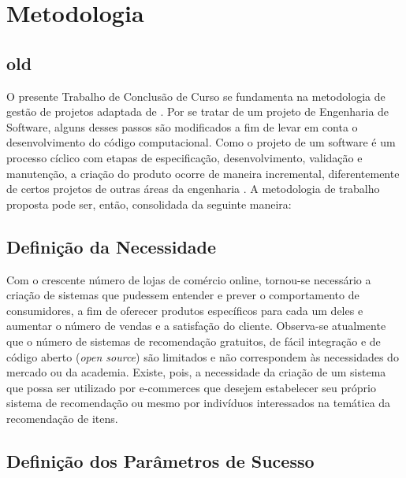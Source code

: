 \chapter[Metodologia]{Metodologia}
\label{chap:metodologia}


\section{old} %
\label{sec:old}

O presente Trabalho de Conclusão de Curso se fundamenta na metodologia de gestão de projetos adaptada de \cite{pmbok}. Por se tratar de um projeto de Engenharia de Software, alguns desses passos são modificados a fim de levar em conta o desenvolvimento do código computacional. Como o projeto de um software é um processo cíclico com etapas de especificação, desenvolvimento, validação e manutenção, a criação do produto ocorre de maneira incremental, diferentemente de certos projetos de outras áreas da engenharia \cite{iterative-development}. A metodologia de trabalho proposta pode ser, então, consolidada da seguinte maneira: 

\section{Definição da Necessidade} %
\label{sec:defini_o_da_necessidade}


Com o crescente número de lojas de comércio online, tornou-se necessário a criação de sistemas que pudessem entender e prever o comportamento de consumidores, a fim de oferecer produtos específicos para cada um deles e aumentar o número de vendas e a satisfação do cliente. Observa-se atualmente que o número de sistemas de recomendação gratuitos, de fácil integração e de código aberto (\textit{open source}) são limitados e não correspondem às necessidades do mercado ou da academia. Existe, pois, a necessidade da criação de um sistema que possa ser utilizado por e-commerces que desejem estabelecer seu próprio sistema de recomendação ou mesmo por indivíduos interessados na temática da recomendação de itens.

\section{Definição dos Parâmetros de Sucesso} %
\label{sec:defini_o_dos_par_metros_de_sucesso}

